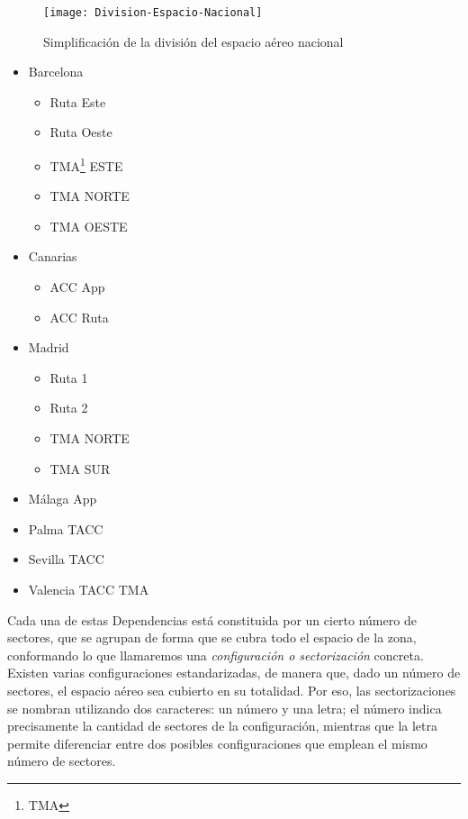 \begin{figure}
    \centering
    \texttt{[image: Division-Espacio-Nacional]}
    \caption{Simplificación de la división del espacio aéreo nacional}
    \label{fig:2:regiones}
\end{figure}

\begin{itemize}
    \item Barcelona
    \begin{itemize}
        \item Ruta Este
        \item Ruta Oeste
        \item TMA\footnote{\acrlong{TMA}} ESTE
        \item TMA NORTE
        \item TMA OESTE
    \end{itemize}
    \item Canarias
    \begin{itemize}
        \item ACC App
        \item ACC Ruta
    \end{itemize}
    \item Madrid
    \begin{itemize}
        \item Ruta 1
        \item Ruta 2
        \item TMA NORTE
        \item TMA SUR
    \end{itemize}
    \item Málaga App
    \item Palma TACC
    \item Sevilla TACC
    \item Valencia TACC TMA
\end{itemize}

Cada una de estas Dependencias está constituida por un cierto número de sectores, que se agrupan de forma que se cubra todo el espacio de la zona, conformando lo que llamaremos una \textit{configuración o sectorización} concreta.
Existen varias configuraciones estandarizadas, de manera que, dado un número de sectores, el espacio aéreo sea cubierto en su totalidad.
Por eso, las sectorizaciones se nombran utilizando dos caracteres: un número y una letra; el número indica precisamente la cantidad de sectores de la configuración, mientras que la letra permite diferenciar entre dos posibles 
configuraciones que emplean el mismo número de sectores.

